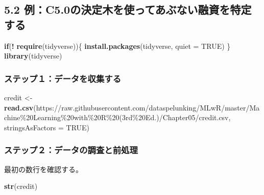 \documentclass[
]{article}
\newenvironment{Shaded}{\begin{snugshade}}{\end{snugshade}}
\newcommand{\AttributeTok}[1]{\textcolor[rgb]{0.13,0.29,0.53}{#1}}
\newcommand{\ConstantTok}[1]{\textcolor[rgb]{0.56,0.35,0.01}{#1}}
\newcommand{\ControlFlowTok}[1]{\textcolor[rgb]{0.13,0.29,0.53}{\textbf{#1}}}
\newcommand{\FunctionTok}[1]{\textcolor[rgb]{0.13,0.29,0.53}{\textbf{#1}}}
\newcommand{\NormalTok}[1]{#1}
\newcommand{\OtherTok}[1]{\textcolor[rgb]{0.56,0.35,0.01}{#1}}
\newcommand{\SpecialCharTok}[1]{\textcolor[rgb]{0.81,0.36,0.00}{\textbf{#1}}}
\newcommand{\StringTok}[1]{\textcolor[rgb]{0.31,0.60,0.02}{#1}}
\begin{document}
\subsection{5.2
例：C5.0の決定木を使ってあぶない融資を特定する}\label{ux4f8bc5.0ux306eux6c7aux5b9aux6728ux3092ux4f7fux3063ux3066ux3042ux3076ux306aux3044ux878dux8cc7ux3092ux7279ux5b9aux3059ux308b}

\begin{Shaded}
\begin{Highlighting}[]
\ControlFlowTok{if}\NormalTok{(}\SpecialCharTok{!} \FunctionTok{require}\NormalTok{(tidyverse))\{}
    \FunctionTok{install.packages}\NormalTok{(}\StringTok{\textquotesingle{}tidyverse\textquotesingle{}}\NormalTok{, }\AttributeTok{quiet =} \ConstantTok{TRUE}\NormalTok{)}
\NormalTok{\}}
\FunctionTok{library}\NormalTok{(tidyverse)}
\end{Highlighting}
\end{Shaded}

\subsubsection{ステップ１：データを収集する}\label{ux30b9ux30c6ux30c3ux30d7uxff11ux30c7ux30fcux30bfux3092ux53ceux96c6ux3059ux308b}

\begin{Shaded}
\begin{Highlighting}[]
\NormalTok{credit }\OtherTok{\textless{}{-}} \FunctionTok{read.csv}\NormalTok{(}\StringTok{\textquotesingle{}https://raw.githubusercontent.com/dataspelunking/MLwR/master/Machine\%20Learning\%20with\%20R\%20(3rd\%20Ed.)/Chapter05/credit.csv\textquotesingle{}}\NormalTok{, }\AttributeTok{stringsAsFactors =} \ConstantTok{TRUE}\NormalTok{)}
\end{Highlighting}
\end{Shaded}

\subsubsection{ステップ２：データの調査と前処理}\label{ux30b9ux30c6ux30c3ux30d7uxff12ux30c7ux30fcux30bfux306eux8abfux67fbux3068ux524dux51e6ux7406}

最初の数行を確認する。

\begin{Shaded}
\begin{Highlighting}[]
\FunctionTok{str}\NormalTok{(credit)}
\end{Highlighting}
\end{Shaded}
\end{document}
